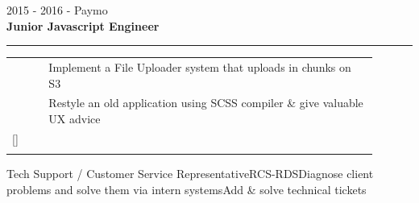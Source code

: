 \documentclass[10pt,A4]{article}
\newcommand{\tzlarrow}{(0,0) -- (0.2,0) -- (0.3,0.2) -- (0.2,0.4) -- (0,0.4) -- (0.1,0.2) -- cycle;}
\newcommand{\larrow}[1]
{\begin{tikzpicture}[scale=0.58]
	 \filldraw[fill=#1!100,draw=#1!100!black]  \tzlarrow
 \end{tikzpicture}
}
\newcommand\AddAdditional[1]{%
\StrLen{#1}[\MyStrLen]%
\ifthenelse{\equal{\MyStrLen}{1}}%
{}{\larrow{bgcol} & #1 \\[2pt]}}
\newcommand{\cvevent}[7] {
\begin{flushleft}
\textcolor{sectcol}{#1 - #3}\\
\textbf{#2}\\[-7pt]
\textcolor{softcol}{\hrule}
\vspace{\spread}
\begin{tabular*}{1\linewidth}{p{0.001\linewidth} p{0.9\linewidth}}
	\larrow{bgcol} & #4 \\[2pt]
	\larrow{bgcol} & #5 \\[\spread]
	\AddAdditional{#6}
\end{tabular*}
\end{flushleft}
}
\newcommand{\mystrut}{\rule[-.3\baselineskip]{0pt}{\baselineskip}}
\newcommand{\spread}{7pt}
\begin{document}
\begin{minipage}[t]{0.485\textwidth}
%
\cvevent{2015 - 2016}{Junior Javascript Engineer}{Paymo}{Implement a File Uploader system that uploads in chunks on S3}{Restyle an old application using SCSS compiler \& give valuable UX advice}

%

\cvevent{2012 - 2015}{Tech Support / Customer Service Representative}{RCS-RDS}{Diagnose client problems and solve them via intern systems}{Add \& solve technical tickets}


\end{minipage}


\null
\vspace*{\fill}
\hspace{-0.25\linewidth}\colorbox{bgcol}{\makebox[1.5\linewidth][c]{\mystrut $\cdot$ \textcolor{white}{github.com/alexghi} $\cdot$ \textcolor{white}{https://www.linkedin.com/in/alex-ghiurau-048252b5/}}}




%
%
%
%
%
%
\end{document}
